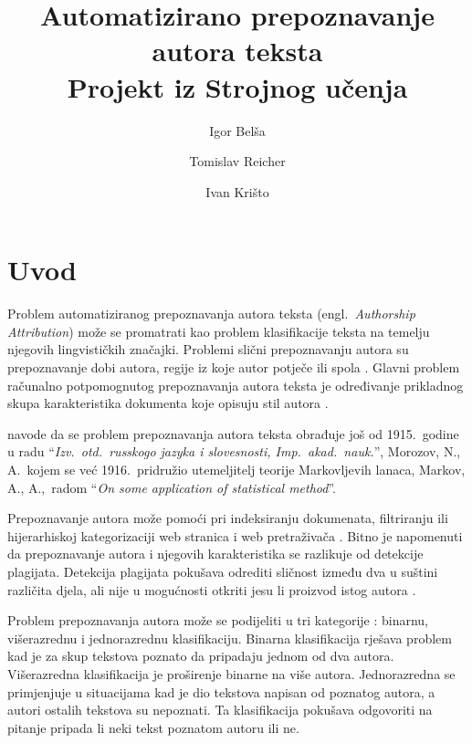 \documentclass{article}
\newcommand{\engl}[1]{(engl.~\emph{#1})}
\begin{document}
\title{Automatizirano prepoznavanje autora teksta\\Projekt iz Strojnog učenja}
\author{Igor Belša \and Tomislav Reicher \and Ivan Krišto}

\maketitle

\thispagestyle{empty}

\tableofcontents
\newpage

\section{Uvod}
Problem automatiziranog prepoznavanja autora teksta \engl{Authorship Attribution}
može se promatrati kao problem klasifikacije teksta na temelju njegovih
lingvističkih značajki. Problemi slični prepoznavanju autora su prepoznavanje
dobi autora, regije iz koje autor potječe ili spola \citep{luyckx2005shallow}.
Glavni problem računalno potpomognutog prepoznavanja autora teksta je određivanje
prikladnog skupa karakteristika dokumenta koje opisuju stil autora
\citep{coyotl2006authorship}.

\citet{kukushkina2001using} navode da se problem prepoznavanja autora teksta
obrađuje još od 1915.~godine u radu ``\emph{Izv.~otd.~russkogo jazyka i
slovesnosti, Imp.~akad.~nauk.}'', Morozov, N., A.~kojem se već 1916.~pridružio
utemeljitelj teorije Markovljevih lanaca, Markov, A., A.,~radom ``\emph{On some
application of statistical method}''.

Prepoznavanje autora može pomoći pri indeksiranju dokumenata, filtriranju ili
hijerarhiskoj kategorizaciji web stranica i web pretraživača
\citep{luyckx2005shallow}. Bitno je napomenuti da prepoznavanje autora i
njegovih karakteristika se razlikuje od detekcije plagijata. Detekcija
plagijata pokušava odrediti sličnost između dva u suštini različita
djela, ali nije u mogućnosti otkriti jesu li proizvod istog autora
\citep{de2001mining}.

Problem prepoznavanja autora može se podijeliti u tri kategorije
\citep{zhao2005effective}: binarnu, višerazrednu i jednorazrednu klasifikaciju.
Binarna klasifikacija rješava problem kad je za skup tekstova poznato da
pripadaju jednom od dva autora. Višerazredna klasifikacija je proširenje
binarne na više autora. Jednorazredna se primjenjuje u situacijama kad je
dio tekstova napisan od poznatog autora, a autori ostalih tekstova su
nepoznati. Ta klasifikacija pokušava odgovoriti na pitanje pripada li neki
tekst poznatom autoru ili ne.
\end{document}

